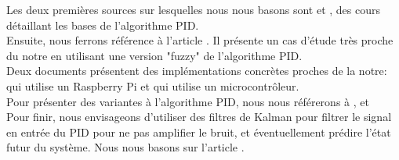 \documentclass[a4paper,10pt]{article}
\begin{document}
Les deux premières sources sur lesquelles nous nous basons sont  \cite{Kinnaert2013} et  \cite{Knospe2006}, des cours détaillant les bases de l'algorithme PID. \\

Ensuite, nous ferrons référence à l'article  \cite{Zheying2014}. Il présente un cas d'étude très proche du notre en utilisant une version "fuzzy" de l'algorithme PID.\\

Deux documents présentent des implémentations concrètes proches de la notre:  \cite{Ioannidis2014} qui utilise un Raspberry Pi et  \cite{ATMEL2005} qui utilise un microcontrôleur. \\

Pour présenter des variantes à l'algorithme PID, nous nous référerons à  \cite{Afou2014},  \cite{ballard1993pid} et  \cite{Saletovi2014} \\

Pour finir, nous envisageons d'utiliser des filtres de Kalman pour filtrer le signal en entrée du PID pour ne pas amplifier le bruit, et éventuellement prédire l'état futur du système. Nous nous basons sur l'article  \cite{Welch2006}.

\newpage

\printbibliography
\end{document}
